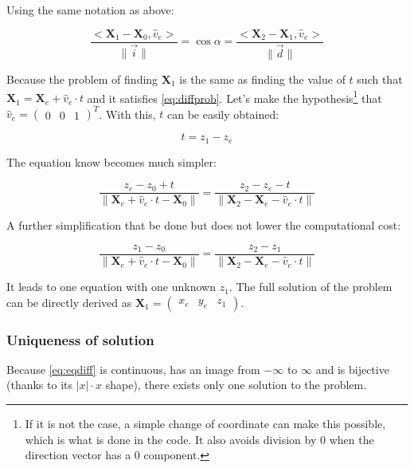 \documentclass[french,10pt]{article}
\begin{document}
    Using the same notation as above:
    
    \begin{equation}\label{eq:diffprob}
        \frac{<\pmb{X}_1 - \pmb{X}_0, \hat{v}_e>}{\|\vec{i}\|} = \cos\alpha = \frac{<\pmb{X}_2 - \pmb{X}_1, \hat{v}_e>}{\|\vec{d}\|}
    \end{equation}
    
    Because the problem of finding $\pmb{X}_1$ is the same as finding the value of $t$ such that $\pmb{X}_1 = \pmb{X}_e + \hat{v}_e \cdot t$ and it satisfies \eqref{eq:diffprob}. Let's make the hypothesis\footnote{If it is not the case, a simple change of coordinate can make this possible, which is what is done in the code. It also avoids division by 0 when the direction vector has a $0$ component.} that $\hat{v}_e = \begin{pmatrix}0 & 0 & 1 \end{pmatrix}
   ^T$. With this, $t$ can be easily obtained:
   
   \begin{equation}
       t = z_1 - z_e
   \end{equation}
   
   The equation know becomes much simpler:
   
   \begin{equation}
       \frac{z_e - z_0 + t}{\|\pmb{X}_e + \hat{v}_e\cdot t - \pmb{X}_0\|} = \frac{z_2 - z_e - t}{\|\pmb{X}_2 - \pmb{X}_e - \hat{v}_e\cdot t\|}
   \end{equation}
   
   A further simplification that be done but does not lower the computational cost:
   
   \begin{equation}\label{eq:eqdiff}
       \frac{z_1 - z_0}{\|\pmb{X}_e + \hat{v}_e\cdot t - \pmb{X}_0\|} = \frac{z_2 - z_1}{\|\pmb{X}_2 - \pmb{X}_e - \hat{v}_e\cdot t\|}
   \end{equation}
   
   It leads to one equation with one unknown $z_1$. The full solution of the problem can be directly derived as $\pmb{X}_1 = \begin{pmatrix}x_e & y_e & z_1 \end{pmatrix}$.
   
   \subsubsection{Uniqueness of solution}
   
        Because \eqref{eq:eqdiff} is continuous, has an image from $-\infty$ to $\infty$ and is bijective (thanks to its $|x|\cdot x$ shape), there exists only one solution to the problem.\\
   
\end{document}
